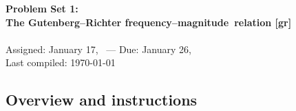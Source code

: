 \documentclass[11pt,titlepage,fleqn]{article}
\newcommand{\fmag}{frequency--magnitude}
\begin{document}

\begin{spacing}{1.2}
\centering
{\large \bf Problem Set 1: \\
The Gutenberg--Richter \fmag\ relation [gr]} \\
\cltag\ \\
Assigned: January 17, \cyear\ --- Due: January 26, \cyear\ \\
Last compiled: \today
\end{spacing}


\subsection*{Overview and instructions}
\end{document}
